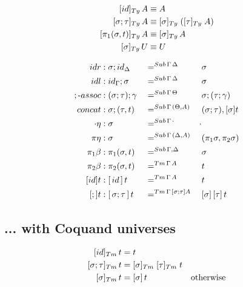 \documentclass[a4paper,UKenglish,numberwithinsect,cleveref,thm-restate]{lipics-v2021}
\begin{document}
\begin{alignat*}{3}
[ \idS ]_{\Ty}\,A             & \jdeq A \\
[ \sigma ; \tau ]_{\Ty}\,A    & \jdeq [ \sigma ]_{\Ty}\;([ \tau ]_{\Ty}\;A) \\
[ \pi_1(\sigma, t) ]_{\Ty}\,A & \jdeq [\sigma]_\Ty\,A \\
[ \sigma ]_{\Ty}\,U           & \jdeq U
\end{alignat*}

\begin{alignat*}{3}
  \mathsf{idr}    & : {\sigma ; \idS_{\Delta}} && =^{\Sub\,\Gamma\,\Delta} && {\sigma} \\
  \mathsf{idl}    & : {\idS_{\Gamma} ; \sigma} && =^{\Sub\,\Gamma\,\Delta} && {\sigma} \\
  ;\text{-}\mathsf{assoc} & : (\sigma ; \tau) ; \gamma && =^{\Sub\,\Gamma\,\Theta} &&  \sigma ; (\tau ; \gamma) \\
  \mathsf{concat} & : \sigma ; (\tau , t)      && =^{\Sub\,\Gamma\,(\Theta, A)} &&  (\sigma ; \tau) , [ \sigma ] t \\
  \emptyctx\eta   & : \sigma                   && =^{\Sub\,\Gamma\,\emptyctx} & \emptysub \\
  \pi\eta         & : \sigma                   && =^{\Sub\,\Gamma\,(\Delta, A)} &&  (\pi_1 \sigma, \pi_2 \sigma) \\
  \pi_1\beta      & : \pi_1(\sigma , t)        && =^{\Sub\,\Gamma,\Delta} &&  \sigma \\
  \pi_2\beta      & : \pi_2(\sigma , t)        && =^{\Tm\,\Gamma\, A} &&  t \\
  [\idS]t         & : {[\,\idS\,]\,t}          && =^{\Tm\,\Gamma\,A} && t \\
  [;]t            & : {[\,\sigma ; \tau\,]\,t} && =^{\Tm\,\Gamma\,[\sigma ; \tau] A} && {[ \sigma ]\,[ \tau ]\,t} \\
\end{alignat*}

\subsection{... with Coquand universes} \label{subsec:SC+U}
\cite{Coquand2013}
\begin{alignat*}{3}
[ \idS ]_{\Tm}\,t          & = t \\
[ \sigma ; \tau ]_{\Tm}\,t & = [ \sigma ]_{\Tm}\;[ \tau ]_{\Tm}\;t \\
[ \sigma ]_{\Tm}\,t        & = [ \sigma ]\,t & \text{otherwise}  \\
\end{alignat*}
\end{document}
